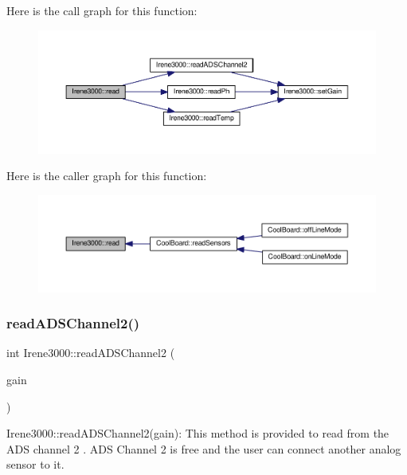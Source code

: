 Here is the call graph for this function\+:
\nopagebreak
\begin{figure}[H]
\begin{center}
\leavevmode
\includegraphics[width=350pt]{classIrene3000_a852a170feea994ea1df01c6b245b5d9a_cgraph}
\end{center}
\end{figure}
Here is the caller graph for this function\+:
\nopagebreak
\begin{figure}[H]
\begin{center}
\leavevmode
\includegraphics[width=350pt]{classIrene3000_a852a170feea994ea1df01c6b245b5d9a_icgraph}
\end{center}
\end{figure}
\mbox{\label{classIrene3000_ae73bd2ed14a199a7e83f4d6458476a7c}} 
\subsubsection{\texorpdfstring{read\+A\+D\+S\+Channel2()}{readADSChannel2()}}
{\footnotesize\ttfamily int Irene3000\+::read\+A\+D\+S\+Channel2 (\begin{DoxyParamCaption}\item[{ads\+Gain\+\_\+t}]{gain }\end{DoxyParamCaption})}

Irene3000\+::read\+A\+D\+S\+Channel2(gain)\+: This method is provided to read from the A\+DS channel 2 . A\+DS Channel 2 is free and the user can connect another analog sensor to it.

